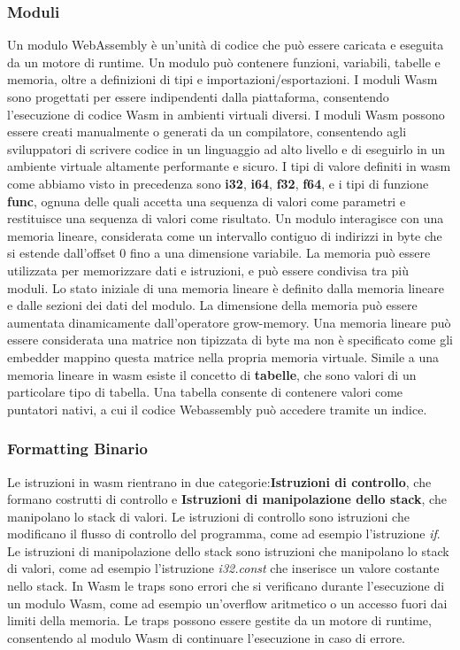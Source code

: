 \documentclass[../../main.tex]{subfiles}
\begin{document}
\subsubsection{Moduli}
Un modulo WebAssembly è un'unità di codice che può essere caricata e eseguita da un motore di runtime. Un modulo può contenere funzioni, variabili, tabelle e memoria, oltre a definizioni di tipi e importazioni/esportazioni. I moduli Wasm sono progettati per essere indipendenti dalla piattaforma, consentendo l'esecuzione di codice Wasm in ambienti virtuali diversi. I moduli Wasm possono essere creati manualmente o generati da un compilatore, consentendo agli sviluppatori di scrivere codice in un linguaggio ad alto livello e di eseguirlo in un ambiente virtuale altamente performante e sicuro.
I tipi di valore definiti in wasm come abbiamo visto in precedenza sono \textbf{i32}, \textbf{i64}, \textbf{f32}, \textbf{f64}, e i tipi di funzione \textbf{func}, ognuna delle quali accetta una sequenza di valori come parametri e restituisce una sequenza di valori come risultato.
Un modulo interagisce con una memoria lineare, considerata come un intervallo contiguo di indirizzi in byte che si estende dall'offset 0 fino a una dimensione variabile. La memoria può essere utilizzata per memorizzare dati e istruzioni, e può essere condivisa tra più moduli.
Lo stato iniziale di una memoria lineare è definito dalla memoria lineare e dalle sezioni dei dati del modulo. La dimensione della memoria può essere aumentata dinamicamente dall'operatore grow-memory.
Una memoria lineare può essere considerata una matrice non tipizzata di byte ma non è specificato come gli embedder mappino questa matrice nella propria memoria virtuale.
Simile a una memoria lineare in wasm esiste il concetto di \textbf{tabelle}, che sono valori di un particolare tipo di tabella.
Una tabella consente di contenere valori come puntatori nativi, a cui il codice Webassembly può accedere tramite un indice.

\subsubsection{Formatting Binario}
Le istruzioni in wasm rientrano in due categorie:\textbf{Istruzioni di controllo}, che formano costrutti di controllo e \textbf{Istruzioni di manipolazione dello stack}, che manipolano lo stack di valori.
Le istruzioni di controllo sono istruzioni che modificano il flusso di controllo del programma, come ad esempio l'istruzione \textit{if}.
Le istruzioni di manipolazione dello stack sono istruzioni che manipolano lo stack di valori, come ad esempio l'istruzione \textit{i32.const} che inserisce un valore costante nello stack.
In Wasm le traps sono errori che si verificano durante l'esecuzione di un modulo Wasm, come ad esempio un'overflow aritmetico o un accesso fuori dai limiti della memoria. Le traps possono essere gestite da un motore di runtime, consentendo al modulo Wasm di continuare l'esecuzione in caso di errore.
\end{document}
